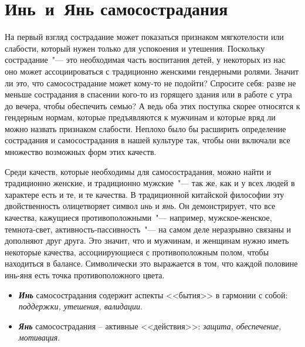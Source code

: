 
\chapter{Инь~и~Янь самосострадания} \label{The_Yin_and_Yang_of_Self-Compassion}

На первый взгляд сострадание может показаться признаком мягкотелости или слабости, который нужен только для успокоения и утешения. Поскольку сострадание~"--- это необходимая часть воспитания детей, у некоторых из нас оно может ассоциироваться с традиционно женскими гендерными ролями. Значит ли это, что самосострадание может кому-то не подойти?
Спросите себя: разве не меньше сострадания в спасении кого-то из горящего здания или в работе с утра до вечера, чтобы обеспечить семью? А ведь оба этих поступка скорее относятся к гендерным нормам, которые предъявляются к мужчинам и которые вряд ли можно назвать признаком слабости. Неплохо было бы расширить определение сострадания и самосострадания в нашей культуре так, чтобы они включали все множество возможных форм этих качеств.

Среди качеств, которые необходимы для самосострадания, можно найти и традиционно женские, и традиционно мужские~"--- так же, как и у всех людей в характере есть и те, и те качества. В традиционной китайской философии эту двойственность олицетворяет символ \textit{инь} и \textit{янь}. Он демонстрирует, что все качества, кажущиеся противоположными~"--- например, мужское-женское, темнота-свет, активность-пассивность~"--- на самом деле неразрывно связаны и дополняют друг друга. Это значит, что и мужчинам, и женщинам нужно иметь некоторые качества, ассоциирующиеся с противоположным полом, чтобы находиться в балансе. Символически это выражается в том, что каждой половине инь-яня есть точка противоположного цвета. 

\newpage 
\begin{center}
	{\Huge \Yinyang}
\end{center}

\begin{itemize}
	\item \textbf{\textit{Инь}} самосострадания содержит аспекты <<бытия>> в гармонии с собой: \textit{поддержки, утешения, валидации}.
	\item \textbf{\textit{Янь}} самосострадания – активные <<действия>>: \textit{защита, обеспечение, мотивация}.
\end{itemize}

